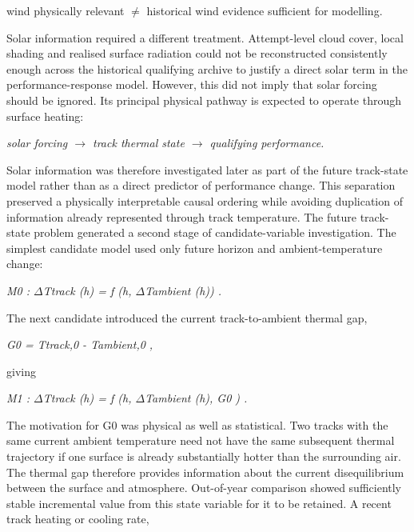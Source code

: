 wind physically relevant \ensuremath{\neq} historical wind evidence sufficient for modelling.

Solar information required a different treatment. Attempt-level cloud cover, local shading and realised surface radiation could not be reconstructed consistently enough across the historical qualifying archive to justify a direct solar term in the performance-response model. However, this did not imply that solar forcing should be ignored. Its principal physical pathway is expected to operate through surface heating:

\begin{center}\textit{solar forcing \ensuremath{\rightarrow} track thermal state \ensuremath{\rightarrow} qualifying performance.}\end{center}

Solar information was therefore investigated later as part of the future track-state model rather than as a direct predictor of performance change. This separation preserved a physically interpretable causal ordering while avoiding duplication of information already represented through track temperature. The future track-state problem generated a second stage of candidate-variable investigation. The simplest candidate model used only future horizon and ambient-temperature change:

\begin{center}\textit{M0 :      \ensuremath{\Delta}Ttrack (h) = f (h, \ensuremath{\Delta}Tambient (h)) .}\end{center}

The next candidate introduced the current track-to-ambient thermal gap,

\begin{center}\textit{G0 = Ttrack,0 - Tambient,0 ,}\end{center}

giving

\begin{center}\textit{M1 :      \ensuremath{\Delta}Ttrack (h) = f (h, \ensuremath{\Delta}Tambient (h), G0 ) .}\end{center}

The motivation for G0 was physical as well as statistical. Two tracks with the same current ambient temperature need not have the same subsequent thermal trajectory if one surface is already substantially hotter than the surrounding air. The thermal gap therefore provides information about the current disequilibrium between the surface and atmosphere. Out-of-year comparison showed sufficiently stable incremental value from this state variable for it to be retained. A recent track heating or cooling rate,

